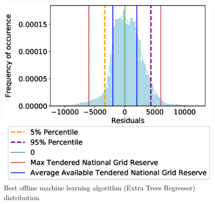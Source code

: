\documentclass[final,3p,times,twocolumn,numbers]{elsarticle}
\begin{document}
\begin{figure}[h]
\centering
\includegraphics[width=\columnwidth,natwidth=500,natheight=400]{figures/results/ExtraTreesRegressor_distribution_plot.eps}
\caption{Best offline machine learning algorithm (Extra Trees Regressor) distribution.}
\label{fig:best_offline_learning_day_distribution}
\end{figure}




%
%
\end{document}
